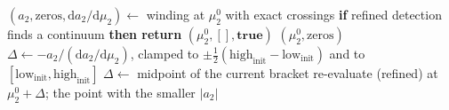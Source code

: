 \begin{algorithm}
\caption{\textsc{RefineAndCorrect}$(\mu_2^0)$ —
exact crossing refinement (fsolve with the analytic $2\times2$ Jacobian) + one Newton step on $a_2(\mu_2)=0$.}
\label{alg:refine-and-correct}
\begin{algorithmic}[1]
\State $(a_2,\mathrm{zeros},\mathrm{d}a_2/\mathrm{d}\mu_2)\gets$ winding at $\mu_2^0$ with exact crossings 
\State \textbf{if} refined detection finds a continuum \textbf{then return} $(\mu_2^0,[],\mathbf{true})$ \EndIf
{} \State \Return $(\mu_2^0,\mathrm{zeros})$ \EndIf
{}
  \State $\Delta\gets-a_2/(\mathrm{d}a_2/\mathrm{d}\mu_2)$, clamped to $\pm\tfrac12(\mathrm{high}_{\mathrm{init}}-\mathrm{low}_{\mathrm{init}})$ and to $[\mathrm{low}_{\mathrm{init}},\mathrm{high}_{\mathrm{init}}]$
\Else
  \State $\Delta\gets$ midpoint of the current bracket 
\EndIf
\State re-evaluate (refined) at $\mu_2^0+\Delta$; \Return the point with the smaller $|a_2|$
\end{algorithmic}
\end{algorithm}

